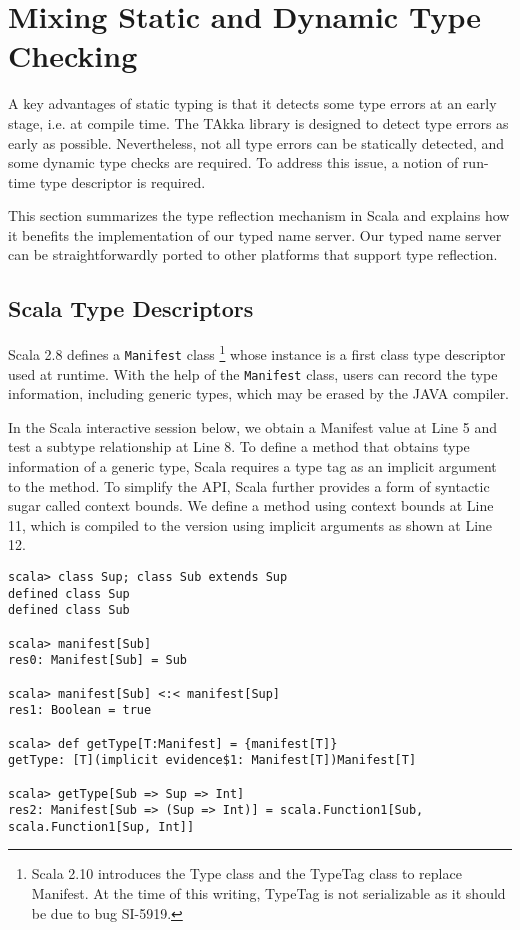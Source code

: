 \section{Mixing Static and Dynamic Type Checking}
\label{type_checking}
A key advantages of static typing is that it detects some type errors at an 
early stage, i.e. at compile time.  The TAkka library is designed to detect 
type errors as early as possible.  Nevertheless, not all type errors can be 
statically detected, and some dynamic type checks are required. To address this 
issue, a notion of run-time type descriptor is required.

This section summarizes the type reflection mechanism in Scala and  explains
how it benefits the implementation of our typed name
server.  Our typed name server can be straightforwardly ported
to other platforms that support type reflection.

\subsection{Scala Type Descriptors}
Scala 2.8 defines a {\tt Manifest} class \footnote{Scala 2.10 introduces 
the Type class and the TypeTag class to replace Manifest.  At the time of this 
writing, TypeTag is not serializable as it should be due to bug SI-5919. } whose 
instance is a first class type descriptor used at runtime.  With the help of 
the {\tt Manifest} class, users can record the type information, including 
generic types, which may be erased by the JAVA compiler.  

In the Scala interactive session below, we obtain a Manifest value at Line 5 and 
test a subtype relationship at Line 8.  To define a method that obtains type 
information of a generic type, Scala requires a type tag as an implicit 
argument to the method.  To simplify the API, Scala further provides a form of
syntactic sugar called context bounds.  We define a method using context
bounds at Line 11, which is compiled to the version using implicit 
arguments as shown at Line 12.


\begin{lstlisting}
scala> class Sup; class Sub extends Sup
defined class Sup
defined class Sub

scala> manifest[Sub]
res0: Manifest[Sub] = Sub

scala> manifest[Sub] <:< manifest[Sup]
res1: Boolean = true

scala> def getType[T:Manifest] = {manifest[T]}
getType: [T](implicit evidence$1: Manifest[T])Manifest[T]

scala> getType[Sub => Sup => Int]
res2: Manifest[Sub => (Sup => Int)] = scala.Function1[Sub, scala.Function1[Sup, Int]]

\end{lstlisting}


